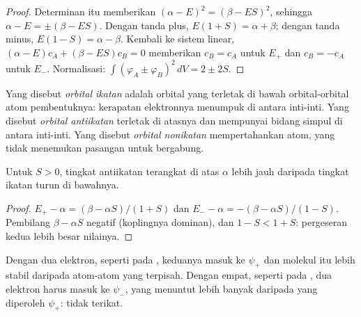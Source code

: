 \begin{proof}
Determinan itu memberikan $(\alpha - E)^2 = (\beta - ES)^2$, sehingga
$\alpha - E = \pm(\beta - ES)$. Dengan tanda plus, $E(1 + S) = \alpha + \beta$;
dengan tanda minus, $E(1 - S) = \alpha
- \beta$. Kembali ke sistem linear,
$(\alpha - E)c_A + (\beta - ES)c_B = 0$ memberikan $c_B
= c_A$ untuk $E_+$
dan $c_B = -c_A$ untuk $E_-$. Normalisasi: $\int(\varphi_A \pm
\varphi_B)^2\,dV = 2 \pm 2S$.
\end{proof}

\begin{definition}\label{def:b2:diatomic-mos:bonding}
Yang disebut \emph{orbital ikatan} adalah orbital yang
terletak di bawah orbital-orbital atom pembentuknya: kerapatan elektronnya
menumpuk di antara inti-inti. Yang disebut \emph{orbital
antiikatan} terletak di atasnya dan mempunyai
bidang simpul di antara inti-inti. Yang disebut \emph{orbital
nonikatan} mempertahankan  atom,
yang tidak menemukan pasangan untuk bergabung.
\end{definition}

\begin{proposition}\label{prop:b2:diatomic-mos:asymmetry}
Untuk $S > 0$, tingkat antiikatan terangkat di atas $\alpha$ lebih jauh
daripada tingkat ikatan turun di bawahnya.
\end{proposition}

\begin{proof}
$E_+ - \alpha = (\beta - \alpha S)/(1 + S)$ dan
$E_- - \alpha = -(\beta - \alpha S)/(1 - S)$. Pembilang $\beta - \alpha S$
negatif (koplingnya dominan), dan $1 - S < 1
+ S$: pergeseran kedua lebih
besar nilainya.
\end{proof}

Dengan dua elektron, seperti pada , keduanya masuk ke $\psi_+$ dan
molekul itu lebih stabil daripada atom-atom yang terpisah. Dengan empat,
seperti pada , dua elektron harus masuk ke $\psi_-$, yang
menuntut lebih banyak daripada yang diperoleh $\psi_+$:  tidak
terikat.

